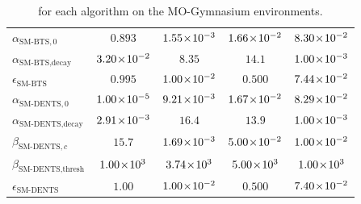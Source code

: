 \begin{table}[tbp]
{\begin{tabular}{l|c|c|c|c}
            $\alpha_{\text{SM-BTS},0}$                      & $0.893$ & $1.55\!\times\!10^{-3}$ & $1.66\!\times\!10^{-2}$ & $8.30\!\times\!10^{-2}$ \\
            $\alpha_{\text{SM-BTS},\text{decay}}$           & $3.20\!\times\!10^{-2}$ & $8.35$ & $14.1$ & $1.00\!\times\!10^{-3}$ \\
            $\epsilon_{\text{SM-BTS}}$                      & $0.995$ & $1.00\!\times\!10^{-2}$ & $0.500$ & $7.44\!\times\!10^{-2}$ \\

            $\alpha_{\text{SM-DENTS},0}$                    & $1.00\!\times\!10^{-5}$ & $9.21\!\times\!10^{-3}$ & $1.67\!\times\!10^{-2}$ & $8.29\!\times\!10^{-2}$ \\
            $\alpha_{\text{SM-DENTS},\text{decay}}$         & $2.91\!\times\!10^{-3}$ & $16.4$ & $13.9$ & $1.00\!\times\!10^{-3}$ \\
            $\beta_{\text{SM-DENTS},c}$                     & $15.7$ & $1.69\!\times\!10^{-3}$ & $5.00\!\times\!10^{-2}$ & $1.00\!\times\!10^{-2}$ \\
            $\beta_{\text{SM-DENTS},\text{thresh}}$         & $1.00\!\times\!10^{3}$ & $3.74\!\times\!10^{3}$ & $5.00\!\times\!10^{3}$ & $1.00\!\times\!10^{3}$ \\
            $\epsilon_{\text{SM-DENTS}}$                    & $1.00$ & $1.00\!\times\!10^{-2}$ & $0.500$ & $7.40\!\times\!10^{-2}$
        \end{tabular}%
        }
        \caption[ for MO-Gymnasium environments.]{ for each algorithm on the MO-Gymnasium environments.}
        \label{table:hyperparams_mogym}
    \end{table}



